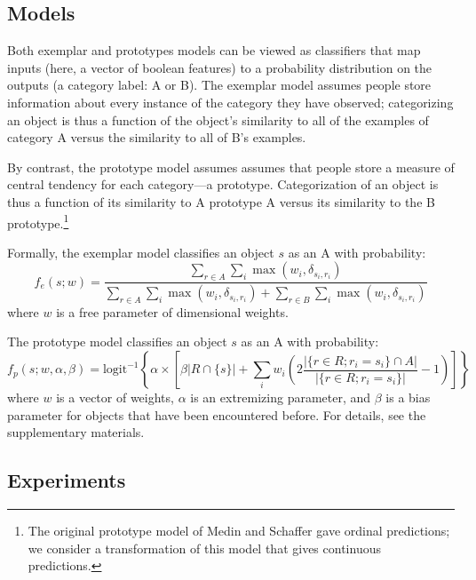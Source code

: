 \documentclass{article}
\newcommand{\lou}[1]{\textcolor{orange}{[lou: #1]}}
\begin{document}


\subsection{Models}

Both exemplar and prototypes models can be viewed as classifiers that map inputs (here, a vector of boolean features) to a probability distribution on the outputs (a category label: A or B).
The exemplar model assumes people store information about every instance of the category they have observed; categorizing an object is thus a function of the object's similarity to all of the examples of category A versus the similarity to all of B's examples.

By contrast, the prototype model assumes assumes that people store a measure of central tendency for each category---a prototype.
Categorization of an object is thus a function of its similarity to A prototype  A versus its similarity to the B prototype.\footnote{The original prototype model of Medin and Schaffer gave ordinal predictions; we consider a transformation of this model that gives continuous predictions.}

Formally, the exemplar model classifies an object $s$ as an A with probability:
$$ f_e(s ; w) = \frac{ \sum\limits_{r \in A}{\sum\limits_{i}\max (w_i, \delta_{s_i, r_i})} }{
  \sum\limits_{r \in A}{\sum\limits_{i}\max (w_i, \delta_{s_i, r_i} )} + \sum\limits_{r \in B}{\sum\limits_{i}\max (w_i, \delta_{s_i, r_i})}} $$
where $w$ is a free parameter of dimensional weights.

The prototype model classifies an object $s$ as an A with probability:
$$ f_p(s ; w, \alpha, \beta) = \mathrm{logit}^{-1}\left\{ \alpha \times \left[ \beta |R \cap \{s\}| + \sum\limits_{i}w_i \left(2\frac{|\{r \in R ; r_i = s_i \} \cap A |}{|\{r \in R ; r_i = s_i \}|} - 1\right) \right] \right\}$$
where $w$ is a vector of weights, $\alpha$ is an extremizing parameter, and $\beta$ is a bias parameter for objects that have been encountered before.
For details, see the supplementary materials.

\subsection{Experiments}
\end{document}
